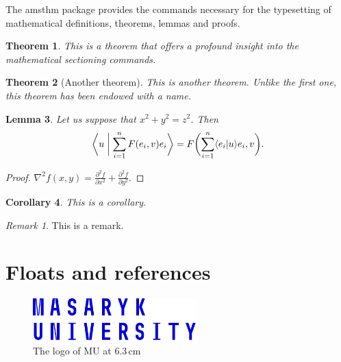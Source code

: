 \documentclass[
  digital,     %
  oneside,     %
  nosansbold,  %
  nocolorbold, %
  lof,         %
  lot,         %
]{fithesis4}
\begin{document}
The \textsf{amsthm} package provides the commands necessary for the
typesetting of mathematical definitions, theorems, lemmas and
proofs.

\newtheorem{theorem}{Theorem}[section] %
\newtheorem{lemma}[theorem]{Lemma}         %
\newtheorem{corollary}[theorem]{Corollary} %
\theoremstyle{definition}
\newtheorem{definition}{Definition}
\theoremstyle{remark}
\newtheorem*{remark}{Remark}

\begin{theorem}
  This is a theorem that offers a profound insight into the
  mathematical sectioning commands.
\end{theorem}
\begin{theorem}[Another theorem]
  This is another theorem. Unlike the first one, this theorem has
  been endowed with a name.
\end{theorem}
\begin{lemma}
  Let us suppose that $x^2+y^2=z^2$. Then
  \begin{equation}
    \biggl\langle u\biggm|\sum_{i=1}^nF(e_i,v)e_i\biggr\rangle
    =F\biggl(\sum_{i=1}^n\langle e_i|u\rangle e_i,v\biggr).
  \end{equation}
\end{lemma}
\begin{proof}
  $\nabla^2 f(x,y)=\frac{\partial^2f}{\partial x^2}+
   \frac{\partial^2f}{\partial y^2}$.
\end{proof}
\begin{corollary}
  This is a corollary.
\end{corollary}
\begin{remark}
  This is a remark.
\end{remark}

\chapter{Floats and references}
\begin{figure}
  \begin{center}
    \includegraphics[width=6.3cm]{fithesis/logo/mu/fithesis-base-english-color}
  \end{center}
  \caption{The logo of \acrlong{MU} at 6.3\,cm}
  \label{fig:mulogo1}
\end{figure}
\end{document}
